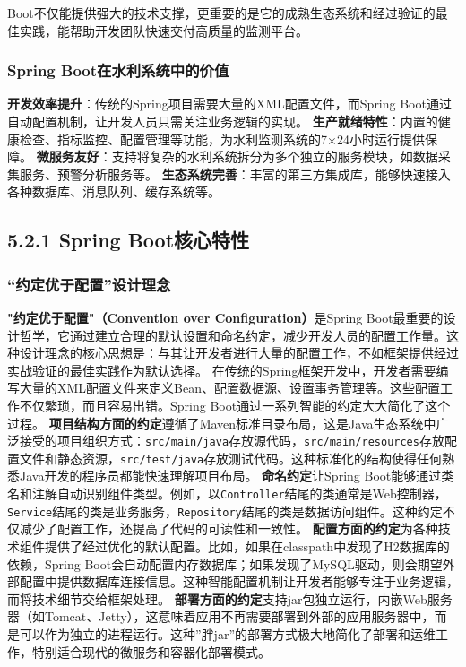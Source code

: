 Boot不仅能提供强大的技术支撑，更重要的是它的成熟生态系统和经过验证的最佳实践，能帮助开发团队快速交付高质量的监测平台。 \subsubsection{Spring
Boot在水利系统中的价值}\label{spring-bootux5728ux6c34ux5229ux7cfbux7edfux4e2dux7684ux4ef7ux503c}
\textbf{开发效率提升}：传统的Spring项目需要大量的XML配置文件，而Spring Boot通过自动配置机制，让开发人员只需关注业务逻辑的实现。
\textbf{生产就绪特性}：内置的健康检查、指标监控、配置管理等功能，为水利监测系统的7×24小时运行提供保障。 \textbf{微服务友好}：支持将复杂的水利系统拆分为多个独立的服务模块，如数据采集服务、预警分析服务等。
\textbf{生态系统完善}：丰富的第三方集成库，能够快速接入各种数据库、消息队列、缓存系统等。 \subsection{5.2.1 Spring
Boot核心特性}\label{spring-bootux6838ux5fc3ux7279ux6027}
\subsubsection{``约定优于配置''设计理念}\label{ux7ea6ux5b9aux4f18ux4e8eux914dux7f6eux8bbeux8ba1ux7406ux5ff5}
\textbf{"约定优于配置"（Convention over Configuration）}是Spring
Boot最重要的设计哲学，它通过建立合理的默认设置和命名约定，减少开发人员的配置工作量。这种设计理念的核心思想是：与其让开发者进行大量的配置工作，不如框架提供经过实战验证的最佳实践作为默认选择。
在传统的Spring框架开发中，开发者需要编写大量的XML配置文件来定义Bean、配置数据源、设置事务管理等。这些配置工作不仅繁琐，而且容易出错。Spring Boot通过一系列智能的约定大大简化了这个过程。
\textbf{项目结构方面的约定}遵循了Maven标准目录布局，这是Java生态系统中广泛接受的项目组织方式：\texttt{src/main/java}存放源代码，\texttt{src/main/resources}存放配置文件和静态资源，\texttt{src/test/java}存放测试代码。这种标准化的结构使得任何熟悉Java开发的程序员都能快速理解项目布局。
\textbf{命名约定}让Spring
Boot能够通过类名和注解自动识别组件类型。例如，以\texttt{Controller}结尾的类通常是Web控制器，\texttt{Service}结尾的类是业务服务，\texttt{Repository}结尾的类是数据访问组件。这种约定不仅减少了配置工作，还提高了代码的可读性和一致性。
\textbf{配置方面的约定}为各种技术组件提供了经过优化的默认配置。比如，如果在classpath中发现了H2数据库的依赖，Spring
Boot会自动配置内存数据库；如果发现了MySQL驱动，则会期望外部配置中提供数据库连接信息。这种智能配置机制让开发者能够专注于业务逻辑，而将技术细节交给框架处理。
\textbf{部署方面的约定}支持jar包独立运行，内嵌Web服务器（如Tomcat、Jetty），这意味着应用不再需要部署到外部的应用服务器中，而是可以作为独立的进程运行。这种''胖jar''的部署方式极大地简化了部署和运维工作，特别适合现代的微服务和容器化部署模式。
